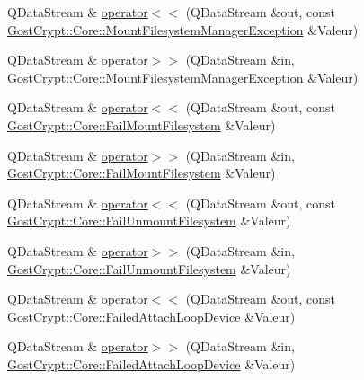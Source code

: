 \begin{DoxyCompactItemize}
\item 
Q\+Data\+Stream \& \hyperlink{namespace_gost_crypt_1_1_core_aa74220910bf9415a6548f6e5b6d81f0c}{operator$<$$<$} (Q\+Data\+Stream \&out, const \hyperlink{class_gost_crypt_1_1_core_1_1_mount_filesystem_manager_exception}{Gost\+Crypt\+::\+Core\+::\+Mount\+Filesystem\+Manager\+Exception} \&Valeur)
\item 
Q\+Data\+Stream \& \hyperlink{namespace_gost_crypt_1_1_core_ad20b3beb363014a26b1c00e5037cf6b9}{operator$>$$>$} (Q\+Data\+Stream \&in, \hyperlink{class_gost_crypt_1_1_core_1_1_mount_filesystem_manager_exception}{Gost\+Crypt\+::\+Core\+::\+Mount\+Filesystem\+Manager\+Exception} \&Valeur)
\item 
Q\+Data\+Stream \& \hyperlink{namespace_gost_crypt_1_1_core_a63176f3ce0a790cecf5c42b42cdfbda3}{operator$<$$<$} (Q\+Data\+Stream \&out, const \hyperlink{class_gost_crypt_1_1_core_1_1_fail_mount_filesystem}{Gost\+Crypt\+::\+Core\+::\+Fail\+Mount\+Filesystem} \&Valeur)
\item 
Q\+Data\+Stream \& \hyperlink{namespace_gost_crypt_1_1_core_a817e52e44a7ae0fb21ee6539aba421c1}{operator$>$$>$} (Q\+Data\+Stream \&in, \hyperlink{class_gost_crypt_1_1_core_1_1_fail_mount_filesystem}{Gost\+Crypt\+::\+Core\+::\+Fail\+Mount\+Filesystem} \&Valeur)
\item 
Q\+Data\+Stream \& \hyperlink{namespace_gost_crypt_1_1_core_a0be254ac1648a96609f144fd0bd020e2}{operator$<$$<$} (Q\+Data\+Stream \&out, const \hyperlink{class_gost_crypt_1_1_core_1_1_fail_unmount_filesystem}{Gost\+Crypt\+::\+Core\+::\+Fail\+Unmount\+Filesystem} \&Valeur)
\item 
Q\+Data\+Stream \& \hyperlink{namespace_gost_crypt_1_1_core_aa87f49503f1e38c17137e4914000b2f6}{operator$>$$>$} (Q\+Data\+Stream \&in, \hyperlink{class_gost_crypt_1_1_core_1_1_fail_unmount_filesystem}{Gost\+Crypt\+::\+Core\+::\+Fail\+Unmount\+Filesystem} \&Valeur)
\item 
Q\+Data\+Stream \& \hyperlink{namespace_gost_crypt_1_1_core_a7b7695f59c153c5a9d7bd79973b4e2ec}{operator$<$$<$} (Q\+Data\+Stream \&out, const \hyperlink{class_gost_crypt_1_1_core_1_1_failed_attach_loop_device}{Gost\+Crypt\+::\+Core\+::\+Failed\+Attach\+Loop\+Device} \&Valeur)
\item 
Q\+Data\+Stream \& \hyperlink{namespace_gost_crypt_1_1_core_a9e66c674336c43a28262f234a5d11817}{operator$>$$>$} (Q\+Data\+Stream \&in, \hyperlink{class_gost_crypt_1_1_core_1_1_failed_attach_loop_device}{Gost\+Crypt\+::\+Core\+::\+Failed\+Attach\+Loop\+Device} \&Valeur)
\item 

\end{DoxyCompactItemize}

